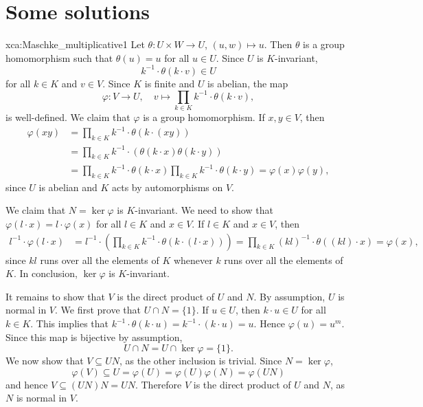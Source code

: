 \section*{Some solutions}

\pagestyle{plain}
\fancyhf{}
\fancyfoot[CE,CO]{\leftmark}
\fancyfoot[LE,RO]{\thepage}


\begin{sol}{xca:Maschke_multiplicative1}
Let $\theta\colon U\times W\to U$, $(u,w)\mapsto u$. Then $\theta$ is a group homomorphism such that 
$\theta(u)=u$ for all $u\in U$. Since $U$ is $K$-invariant, 
\[
k^{-1}\cdot \theta(k\cdot v)\in U
\]
for all $k\in K$ and $v\in V$. 
Since $K$ is finite and $U$ is abelian, 
the map 
\[
\varphi\colon V\to U,\quad 
v\mapsto \prod_{k\in K}k^{-1}\cdot \theta(k\cdot v), 
\]
is well-defined. 
We claim that $\varphi$ is a group homomorphism. If $x,y\in V$, then 
\begin{align*}
    \varphi(xy) &= \prod_{k\in K}k^{-1}\cdot \theta(k\cdot (xy))\\
    &= \prod_{k\in K}k^{-1}\cdot (\theta(k\cdot x)\theta(k\cdot y))\\
    &= \prod_{k\in K}k^{-1}\cdot \theta(k\cdot x) \prod_{k\in K}k^{-1}\cdot \theta(k\cdot y)=\varphi(x)\varphi(y),
\end{align*}
since $U$ is abelian and $K$ acts by automorphisms on $V$. 

We claim that $N=\ker\varphi$ is $K$-invariant. 
We need to show that $\varphi(l\cdot x)=l\cdot\varphi(x)$ for all $l\in K$ and $x\in V$. 
If $l\in K$ and $x\in V$, then 
\begin{align*}
l^{-1}\cdot\varphi(l\cdot x)&=l^{-1}\cdot\left(\prod_{k\in K}k^{-1}\cdot \theta(k\cdot (l\cdot x))\right)=\prod_{k\in K}(kl)^{-1}\cdot\theta( (kl)\cdot x)=\varphi(x),
\end{align*}
since $kl$ runs over all the elements of $K$ whenever $k$ runs over all the elements of $K$.
In conclusion, $\ker\varphi$ is $K$-invariant. 

It remains to show that $V$ is the direct product of $U$ and $N$. By assumption, $U$ is normal in $V$. 
We first prove that $U\cap N=\{1\}$. If $u\in U$, then $k\cdot u\in U$ for all $k\in K$. This implies that 
$k^{-1}\cdot\theta(k\cdot u)=k^{-1}\cdot (k\cdot u)=u$. Hence $\varphi(u)=u^m$. Since this map is bijective by assumption,  
\[
U\cap N=U\cap\ker\varphi=\{1\}.
\]
We now show that $V\subseteq UN$, as the other inclusion is trivial. Since $N=\ker\varphi$,  
\[
\varphi(V)\subseteq U=\varphi(U)=\varphi(U)\varphi(N)=\varphi(UN) 
\]
and hence $V\subseteq (UN)N=UN$. 
Therefore $V$ is the direct product of $U$ and $N$, as $N$ is normal in $V$.
\end{sol}

